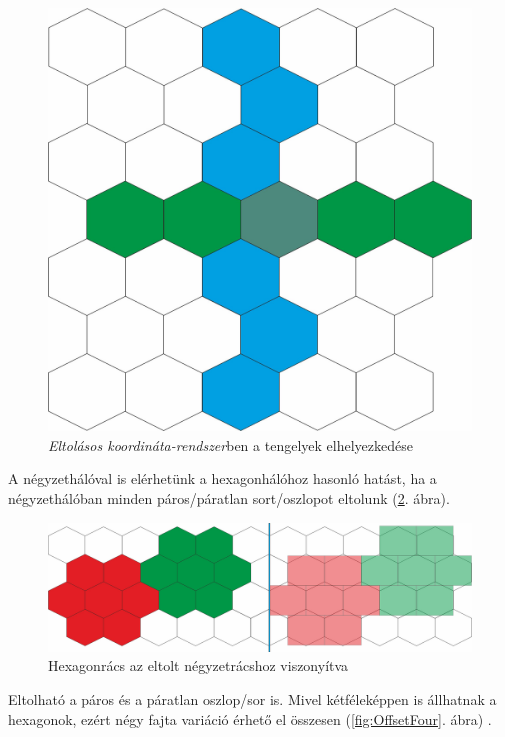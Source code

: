 \begin{figure}[h!]
\centering
\includegraphics[scale=0.3]{kepek/OffsetCoord.jpg}
\caption{\textit{Eltolásos koordináta-rendszer}ben a tengelyek elhelyezkedése}
\label{fig:OffsetCoord}
\end{figure}

\newpage
A négyzethálóval is elérhetünk a hexagonhálóhoz hasonló hatást, ha a négyzethálóban minden páros/páratlan sort/oszlopot eltolunk (\ref{fig:Hex_Sq}. ábra).

\begin{figure}[h!]
\centering
\includegraphics[scale=0.3]{kepek/Hex_Sq.jpg}
\caption{Hexagonrács az eltolt négyzetrácshoz viszonyítva}
\label{fig:Hex_Sq}
\end{figure}

Eltolható a páros és a páratlan oszlop/sor is. Mivel kétféleképpen is állhatnak a hexagonok, ezért négy fajta variáció érhető el összesen (\ref{fig:OffsetFour}. ábra) \cite{Offset}.

